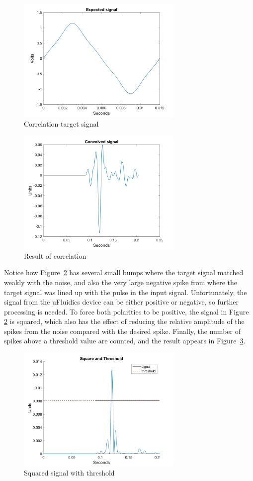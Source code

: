 \documentclass[10pt, journal]{IEEEtran}
\begin{document}
\begin{figure}[h]
  \includegraphics[width=8cm]{../matlab/plot2.png}
  \caption{Correlation target signal}
  \label{fig:target}
\end{figure}

\begin{figure}[h]
  \includegraphics[width=8cm]{../matlab/plot3.png}
  \caption{Result of correlation}
  \label{fig:correl}
\end{figure}

Notice how Figure \,\ref{fig:correl} has several small bumps where the
target signal matched weakly with the noise, and also the very large
negative spike from where the target signal was lined up with the
pulse in the input signal. Unfortunately, the signal from the
uFluidics device can be either positive or negative, so further
processing is needed. To force both polarities to be positive, the
signal in Figure \,\ref{fig:correl} is squared, which also has the
effect of reducing the relative amplitude of the spikes from the noise
compared with the desired spike. Finally, the number of spikes above a
threshold value are counted, and the result appears in Figure
\,\ref{fig:result}.

\begin{figure}[h]
  \includegraphics[width=8cm]{../matlab/plot4.png}
  \caption{Squared signal with threshold}
  \label{fig:result}
\end{figure}
\end{document}
